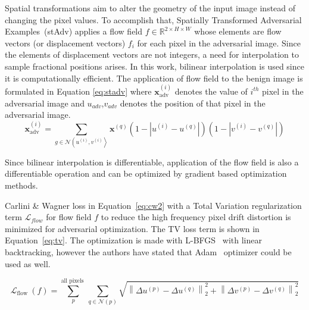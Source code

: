 Spatial transformations aim to alter the geometry of the input image instead of changing the pixel values. To accomplish that, Spatially Transformed Adversarial Examples~(stAdv) applies a flow field \(f \in \mathbb{R}^{2\times H \times W}\) whose elements are flow vectors (or displacement vectors) \(f_i\) for each pixel in the adversarial image. Since the elements of displacement vectors are not integers, a need for interpolation to sample fractional positions arises. In this work, bilinear interpolation is used since it is computationally efficient. The application of flow field to the benign image is formulated in Equation \ref{eq:stadv} where \(\mathbf{x}_{\mathrm{adv}}^{(i)}\) denotes the value of $i^{th}$ pixel in the adversarial image and \(u_{adv}\),\(v_{adv}\) denotes the position of that pixel in the adversarial image.
\begin{equation}
    \label{eq:stadv}
    \mathbf{x}_{\mathrm{adv}}^{(i)}=\sum_{g \in \mathcal{N}\left(u^{(i)}, v^{(i)}\right\rangle} \mathbf{x}^{(q)}\left(1-\left|u^{(i)}-u^{(q)}\right|\right)\left(1-\left|v^{(i)}-v^{(q)}\right|\right)
\end{equation}

Since bilinear interpolation is differentiable, application of the flow field is also a differentiable operation and can be optimized by gradient based optimization methods. %



Carlini \& Wagner loss in Equation~\ref{eq:cw2} with a Total Variation regularization term \(\mathcal{L}_{flow}\) for flow field \(f\) to reduce the high frequency pixel drift distortion is minimized for adversarial optimization. The TV loss term is shown in Equation~\ref{eq:tv}. The optimization is made with L-BFGS~\cite{liu1989limited} with linear backtracking, however the authors have stated that Adam~\cite{kingma2015adam} optimizer could be used as well.


\begin{equation}
    \label{eq:tv}
    \mathcal{L}_{\text {flow }}(f)=\sum_{p}^{\text {all pixels }} \sum_{q \in \mathcal{N}(p)} \sqrt{\left\|\Delta u^{(p)}-\Delta u^{(q)}\right\|_{2}^{2}+\left\|\Delta v^{(p)}-\Delta v^{(q)}\right\|_{2}^{2}}
\end{equation}






